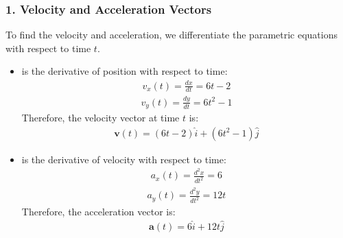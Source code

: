 \documentclass[letterpaper,10pt,english]{jupyterBook}
\begin{document}
\subsubsection{1. Velocity and Acceleration Vectors}
\label{\detokenize{prerequisites:velocity-and-acceleration-vectors}}
\sphinxAtStartPar
To find the velocity and acceleration, we differentiate the parametric equations with respect to time \(t\).
\begin{itemize}
\item {} 
\sphinxAtStartPar
{} is the derivative of position with respect to time:
\begin{equation*}
\begin{split}
  v_x(t) = \frac{dx}{dt} = 6t - 2
  \end{split}
\end{equation*}\begin{equation*}
\begin{split}
  v_y(t) = \frac{dy}{dt} = 6t^2 - 1
  \end{split}
\end{equation*}
\sphinxAtStartPar
Therefore, the velocity vector at time \(t\) is:
\begin{equation*}
\begin{split}
  \mathbf{v}(t) = (6t - 2) \hat{i} + (6t^2 - 1) \hat{j}
  \end{split}
\end{equation*}
\item {} 
\sphinxAtStartPar
{} is the derivative of velocity with respect to time:
\begin{equation*}
\begin{split}
  a_x(t) = \frac{d^2x}{dt^2} = 6
  \end{split}
\end{equation*}\begin{equation*}
\begin{split}
  a_y(t) = \frac{d^2y}{dt^2} = 12t
  \end{split}
\end{equation*}
\sphinxAtStartPar
Therefore, the acceleration vector is:
\begin{equation*}
\begin{split}
  \mathbf{a}(t) = 6 \hat{i} + 12t \hat{j}
  \end{split}
\end{equation*}
\end{itemize}
\end{document}
